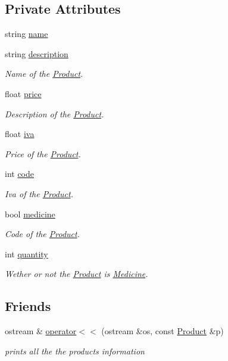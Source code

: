 \subsection*{Private Attributes}
\begin{DoxyCompactItemize}
\item 
string \hyperlink{classProduct_acc9bddcf74112d85a6dc231db2269b8d}{name}
\item 
string \hyperlink{classProduct_ac39d552b24ce60549271a85aea3f5ed0}{description}
\begin{DoxyCompactList}\small\item\em Name of the \hyperlink{classProduct}{Product}. \end{DoxyCompactList}\item 
float \hyperlink{classProduct_ad1fd6ee6c8653bf81898668b1d01b05d}{price}
\begin{DoxyCompactList}\small\item\em Description of the \hyperlink{classProduct}{Product}. \end{DoxyCompactList}\item 
float \hyperlink{classProduct_ac772b7a57928ccfdb02309bde2e4fa33}{iva}
\begin{DoxyCompactList}\small\item\em Price of the \hyperlink{classProduct}{Product}. \end{DoxyCompactList}\item 
int \hyperlink{classProduct_acf4c1bb9d62717e3b2ecaaf7ec5dffd7}{code}
\begin{DoxyCompactList}\small\item\em Iva of the \hyperlink{classProduct}{Product}. \end{DoxyCompactList}\item 
bool \hyperlink{classProduct_a2da08ec2fcf6b1d9383e42f6419b3a06}{medicine}
\begin{DoxyCompactList}\small\item\em Code of the \hyperlink{classProduct}{Product}. \end{DoxyCompactList}\item 
int \hyperlink{classProduct_a299430b8756aba9f6d44af46831791cc}{quantity}
\begin{DoxyCompactList}\small\item\em Wether or not the \hyperlink{classProduct}{Product} is \hyperlink{classMedicine}{Medicine}. \end{DoxyCompactList}\end{DoxyCompactItemize}
\subsection*{Friends}
\begin{DoxyCompactItemize}
\item 
ostream \& \hyperlink{classProduct_a8e60cf0623449094e3d8672262fe5420}{operator$<$$<$} (ostream \&os, const \hyperlink{classProduct}{Product} \&p)
\begin{DoxyCompactList}\small\item\em prints all the the product\textquotesingle{}s information \end{DoxyCompactList}\end{DoxyCompactItemize}


